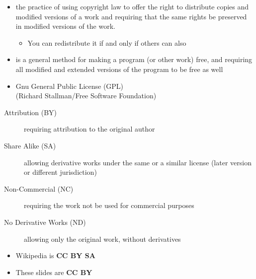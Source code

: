 \documentclass[a4paper,landscape,headrule,footrule,xetex]{foils}
\begin{document}

\begin{itemize}
\item the practice of using copyright law to offer the right to distribute copies and modified versions of a work and requiring that the same rights be preserved in modified versions of the work.
  \begin{itemize}
  \item You can redistribute it if and only if others can also
  \end{itemize}
\item {} is a general method for making a program (or other work) free, and requiring all modified and extended versions of the program to be free as well
\item Gnu General Public License (GPL)
 \\ (Richard Stallman/Free Software Foundation)
\end{itemize}


\begin{description}
\item [Attribution (BY)] requiring attribution to the original author
\item [Share Alike (SA)] allowing derivative  works under the same or
  a similar license (later version or different jurisdiction)
\item [Non-Commercial (NC)] requiring the work not be used for commercial purposes
\item [No Derivative Works (ND)] allowing only the original work, without derivatives
\end{description}

\begin{itemize}
\item Wikipedia is \textbf{CC BY SA}
\item These slides are \textbf{CC BY}
\end{itemize}


\end{document}
